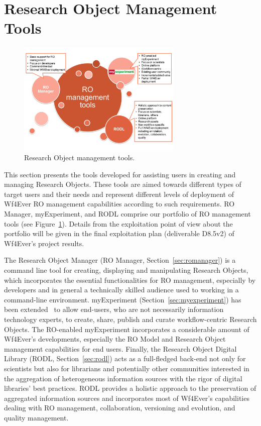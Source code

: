 \section{Research Object Management Tools}
\label{sec:romt}

\begin{figure}
\begin{center}
\includegraphics[width=0.7\textwidth]{Figures/ROManagementTools-exploitation.png}
\end{center}
\caption{Research Object management tools.}
\label{fig:romt}
\end{figure}

This section presents the tools developed for assisting users in creating and managing Research Objects. These tools are aimed towards different types of target users and their needs and represent different levels of deployment of Wf4Ever RO management capabilities according to such requirements. RO Manager, myExperiment, and RODL comprise our portfolio of RO management tools (see Figure~\ref{fig:romt}). Details from the exploitation point of view about the portfolio will be given in the final exploitation plan (deliverable D8.5v2) of Wf4Ever's project results.

The Research Object Manager (RO Manager, Section~\ref{sec:romanager}) is a command line tool for creating, displaying and manipulating Research Objects, which incorporates the essential functionalities for RO management, especially by developers and in general a technically skilled audience used to working in a command-line environment. myExperiment (Section~\ref{sec:myexperiment}) has been extended~\cite{DBLP:journals/fgcs/RoureGS09} to allow end-users, who are not necessarily information technology experts, to create, share, publish and curate workflow-centric Research Objects. The RO-enabled myExperiment incorporates a considerable amount of Wf4Ever's developments, especially the RO Model and Research Object management capabilities for end users. Finally, the Research Object Digital Library (RODL, Section~\ref{sec:rodl}) acts as a full-fledged back-end not only for scientists but also for librarians and potentially other communities interested in the aggregation of heterogeneous information sources with the rigor of digital libraries' best practices. RODL provides a holistic approach to the preservation of aggregated information sources and incorporates most of Wf4Ever's capabilities dealing with RO management, collaboration, versioning and evolution, and quality management. 



